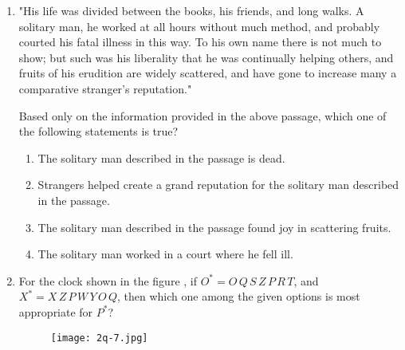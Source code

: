 \documentclass[journal,12pt,onecolumn]{article}
\theoremstyle{remark}
\begin{document}
\begin{enumerate}
    \item "His life was divided between the books, his friends, and long walks. A solitary man, he worked at all hours without much method, and probably courted his fatal illness in this way. To his own name there is not much to show; but such was his liberality that he was continually helping others, and fruits of his erudition are widely scattered, and have gone to increase many a comparative stranger's reputation."
    
    
    Based only on the information provided in the above passage, which one of the following statements is true?

    \hfill{}
    \begin{enumerate}
        \item The solitary man described in the passage is dead.
        \item Strangers helped create a grand reputation for the solitary man described in the passage.
        \item The solitary man described in the passage found joy in scattering fruits.
        \item The solitary man worked in a court where he fell ill.
    \end{enumerate}

    \item For the clock shown in the figure , if
    $O^* = O \, Q \, S \, Z \, P \, R \, T$, and
    $X^* = X \, Z \, P \, W \, Y \, O \, Q$,
    then which one among the given options is most appropriate for $P^*$?
    \begin{figure}[H]
        \centering
        \texttt{[image: 2q-7.jpg]}
        \caption{}
        \label{fig:q7}
    \end{figure}

    \hfill{}
    \begin{enumerate}
    \end{enumerate}


\end{enumerate}
\end{document}
